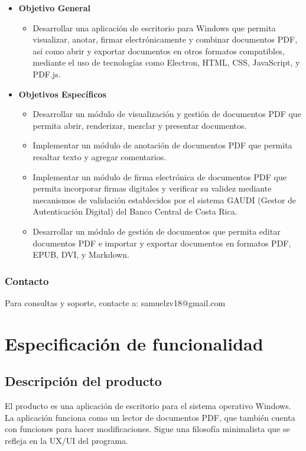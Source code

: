 \begin{itemize}
    \item \textbf{Objetivo General}
    \begin{itemize}
        \item Desarrollar una aplicación de escritorio para Windows que permita visualizar, anotar, firmar electrónicamente y combinar documentos PDF, así como abrir y exportar documentos en otros formatos compatibles, mediante el uso de tecnologías como Electron, HTML, CSS, JavaScript, y PDF.js.
    \end{itemize}
    \item \textbf{Objetivos Específicos}
    \begin{itemize}
        \item Desarrollar un módulo de visualización y gestión de documentos PDF que permita abrir, renderizar, mezclar y presentar documentos.
        \item Implementar un módulo de anotación de documentos PDF que permita resaltar texto y agregar comentarios.
        \item Implementar un módulo de firma electrónica de documentos PDF que permita incorporar firmas digitales y verificar su validez mediante mecanismos de validación establecidos por el sistema GAUDI (Gestor de Autenticación Digital) del Banco Central de Costa Rica.
        \item Desarrollar un módulo de gestión de documentos que permita editar documentos PDF e importar y exportar documentos en formatos PDF, EPUB, DVI, y Markdown.

    \end{itemize}
\end{itemize}

\subsection{Contacto}
Para consultas y soporte, contacte a: samuelzv18@gmail.com


\chapter{Especificación de funcionalidad}
\section{Descripción del producto}

El producto es una aplicación de escritorio para el sistema operativo Windows. La aplicación funciona como un lector de documentos PDF, que también cuenta con funciones para hacer modificaciones. Sigue una filosofía minimalista que se refleja en la UX/UI del programa.

